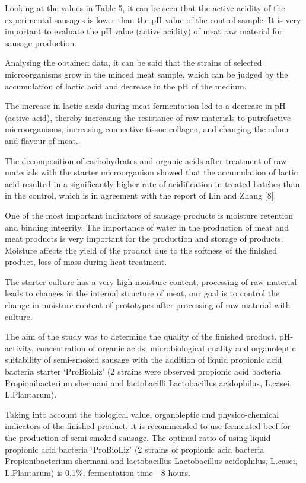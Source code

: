 \begin{multicols}{2}
Looking at the values in Table 5, it can be seen that the active acidity
of the experimental sausages is lower than the pH value of the control
sample. It is very important to evaluate the pH value (active acidity)
of meat raw material for sausage production.

Analysing the obtained data, it can be said that the strains of selected
microorganisms grow in the minced meat sample, which can be judged by
the accumulation of lactic acid and decrease in the pH of the medium.

The increase in lactic acids during meat fermentation led to a decrease
in pH (active acid), thereby increasing the resistance of raw materials
to putrefactive microorganisms, increasing connective tissue collagen,
and changing the odour and flavour of meat.

The decomposition of carbohydrates and organic acids after treatment of
raw materials with the starter microorganism showed that the
accumulation of lactic acid resulted in a significantly higher rate of
acidification in treated batches than in the control, which is in
agreement with the report of Lin and Zhang {[}8{]}.

One of the most important indicators of sausage products is moisture
retention and binding integrity. The importance of water in the
production of meat and meat products is very important for the
production and storage of products. Moisture affects the yield of the
product due to the softness of the finished product, loss of mass during
heat treatment.

The starter culture has a very high moisture content, processing of raw
material leads to changes in the internal structure of meat, our goal is
to control the change in moisture content of prototypes after processing
of raw material with culture.

The aim of the study was to determine the quality of the finished
product, pH-activity, concentration of organic acids, microbiological
quality and organoleptic suitability of semi-smoked sausage with the
addition of liquid propionic acid bacteria starter `ProBioLiz' (2
strains were observed propionic acid bacteria Propionibacterium shermani
and lactobacilli Lactobacillus acidophilus, L.casei, L.Plantarum).

Taking into account the biological value, organoleptic and
physico-chemical indicators of the finished product, it is recommended
to use fermented beef for the production of semi-smoked sausage. The
optimal ratio of using liquid propionic acid bacteria `ProBioLiz' (2
strains of propionic acid bacteria Propionibacterium shermani and
lactobacillus Lactobacillus acidophilus, L.casei, L.Plantarum) is 0.1\%,
fermentation time - 8 hours.


\end{multicols}

